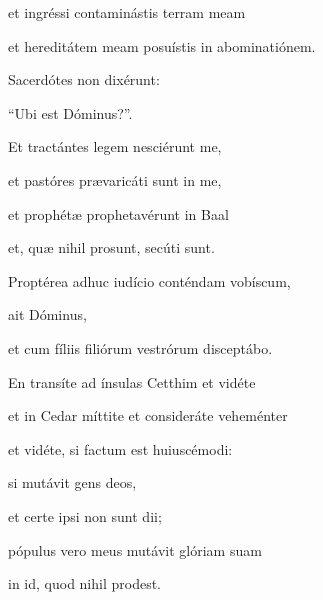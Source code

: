 {\noindent et ingréssi contaminástis terram meam

\noindent et hereditátem meam posuístis in abominatiónem.

\noindent Sacerdótes non dixérunt:

\noindent “Ubi est Dóminus?”.

\noindent Et tractántes legem nesciérunt me,

\noindent et pastóres prævaricáti sunt in me,

\noindent et prophétæ prophetavérunt in Baal

\noindent et, quæ nihil prosunt, secúti sunt.

\noindent Proptérea adhuc iudício conténdam vobíscum,

\noindent ait Dóminus,

\noindent et cum fíliis filiórum vestrórum disceptábo.

\noindent En transíte ad ínsulas Cetthim et vidéte

\noindent et in Cedar míttite et consideráte veheménter

\noindent et vidéte, si factum est huiuscémodi:

\noindent si mutávit gens deos,

\noindent et certe ipsi non sunt dii;

\noindent pópulus vero meus mutávit glóriam suam

\noindent in id, quod nihil prodest.}
\newcommand{\responsoriumi}{\pars{Responsorium 1.} \scriptura{\Rbardot{} Ier. 14, 19.20 \Vbardot{} Bar. 2, 12; \textbf{H417}}

\vspace{-5mm}

\responsorium{VIII}{temporalia/resp-sustinuimuspacemetnonvenit-CROCHU.gtex}{}

\rubrica{vel ad libitum:}

\vspace{3mm}

\pars{Responsorium 1.} \scriptura{\Rbardot{} Mic. 6, 3; \textbf{H161}}

\vspace{-5mm}

\responsorium{VII}{temporalia/resp-populemeusquidfeci-CROCHU.gtex}{}}
